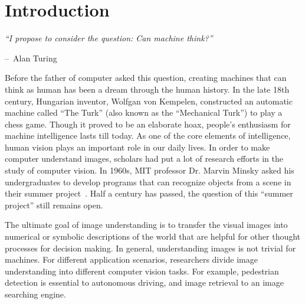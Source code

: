 \chapter{Introduction}
\label{chap:intro}

\makeatletter
\newenvironment{chapquote}[2][2em]
{\setlength{\@tempdima}{#1} \def\chapquote@author{#2} \parshape 1
  \@tempdima \dimexpr\textwidth-2\@tempdima\relax \itshape}
{\par\normalfont\hfill--\
\chapquote@author\hspace*{\@tempdima}\par\bigskip}
\makeatother

\begin{chapquote}{Alan Turing}
  ``I propose to consider the question: Can machine think?''
\end{chapquote}

Before the father of computer asked this question, creating
machines that can think as human has been a dream through the human
history. In the late 18th century, Hungarian inventor, Wolfgan von
Kempelen, constructed an automatic machine called ``The Turk'' (also
known as the ``Mechanical Turk'') to play a chess game. Though it
proved to be an elaborate hoax, people's enthusiasm for machine
intelligence lasts till today. As one of the core elements of
intelligence, human vision plays an important role in our daily lives.
In order to make computer understand images, scholars had put a lot of
research efforts in the study of computer vision. In 1960s, MIT
professor Dr. Marvin Minsky asked his undergraduates to develop
programs that can recognize objects from a scene in their summer
project~\cite{boden2006mind}. Half a century has passed, the question
of this ``summer project'' still remains open.

The ultimate goal of image understanding is to transfer the visual
images into numerical or symbolic descriptions of the world
that are helpful for other thought processes for decision making.
In general, understanding images is not trivial for machines.
For different application scenarios, researchers divide image
understanding into different computer vision tasks. For example,
pedestrian detection is essential to autonomous driving, and image
retrieval to an image searching engine.

